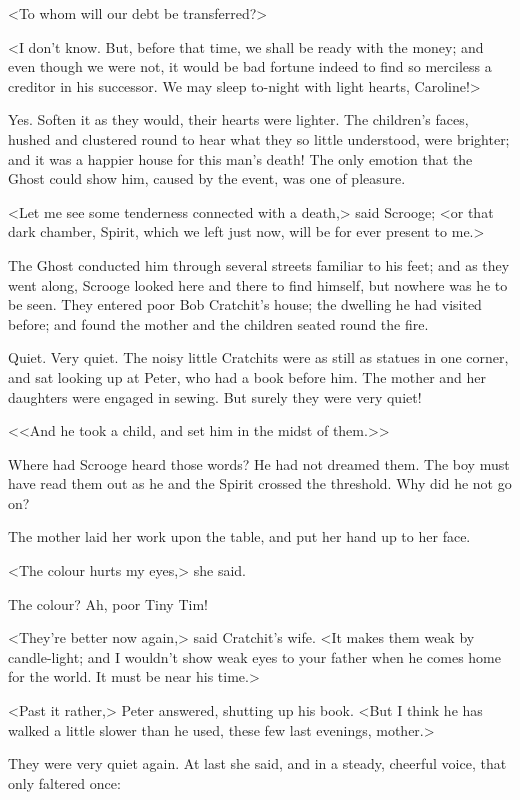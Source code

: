 <To whom will our debt be transferred?>

<I don't know. But, before that time, we shall be ready with the money; and even
though we were not, it would be bad fortune indeed to find so merciless a
creditor in his successor. We may sleep to-night with light hearts, Caroline!>

Yes. Soften it as they would, their hearts were lighter. The children's faces,
hushed and clustered round to hear what they so little understood, were
brighter; and it was a happier house for this man's death! The only emotion that
the Ghost could show him, caused by the event, was one of pleasure.

<Let me see some tenderness connected with a death,> said Scrooge; <or that dark
chamber, Spirit, which we left just now, will be for ever present to me.>

The Ghost conducted him through several streets familiar to his feet; and as
they went along, Scrooge looked here and there to find himself, but nowhere was
he to be seen. They entered poor Bob Cratchit's house; the dwelling he had
visited before; and found the mother and the children seated round the fire.

Quiet. Very quiet. The noisy little Cratchits were as still as statues in one
corner, and sat looking up at Peter, who had a book before him. The mother and
her daughters were engaged in sewing. But surely they were very quiet!

<<And he took a child, and set him in the midst of them.>>

Where had Scrooge heard those words? He had not dreamed them. The boy must have
read them out as he and the Spirit crossed the threshold. Why did he not go on?

The mother laid her work upon the table, and put her hand up to her face.

<The colour hurts my eyes,> she said.

The colour? Ah, poor Tiny Tim!

<They're better now again,> said Cratchit's wife. <It makes them weak by
candle-light; and I wouldn't show weak eyes to your father when he comes home
for the world. It must be near his time.>

<Past it rather,> Peter answered, shutting up his book. <But I think he has
walked a little slower than he used, these few last evenings, mother.>

They were very quiet again. At last she said, and in a steady, cheerful voice,
that only faltered once:

